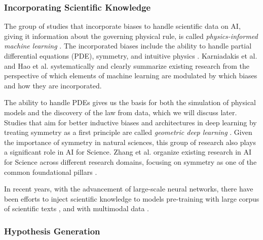 
\subsubsection{Incorporating Scientific Knowledge}

The group of studies that incorporate biases to handle scientific data on AI, giving it information about the governing physical rule, is called \textit{physics-informed machine learning} \cite{karniadakis2021physics}. The incorporated biases include the ability to handle partial differential equations (PDE), symmetry, and intuitive physics \cite{hao2022physics}. Karniadakis et al. \cite{karniadakis2021physics} and Hao et al. \cite{hao2022physics} systematically and clearly summarize existing research from the perspective of which elements of machine learning are modulated by which biases and how they are incorporated. %

The ability to handle PDEs gives us the basis for both the simulation of physical models and the discovery of the law from data, which we will discuss later. Studies that aim for better inductive biases and architectures in deep learning by treating symmetry as a first principle are called \textit{geometric deep learning} \cite{bronstein2021geometric}. Given the importance of symmetry in natural sciences, this group of research also plays a significant role in AI for Science. Zhang et al.  organize existing research in AI for Science across different research domains, focusing on symmetry as one of the common foundational pillars \cite{zhang2023artificial}.

In recent years, with the advancement of large-scale neural networks, there have been efforts to inject scientific knowledge to models pre-training with large corpus of scientific texts \cite{taylor2022galactica,beltagy2019scibert}, and with multimodal data \cite{singhal2023towards}.

\subsubsection{Hypothesis Generation}

